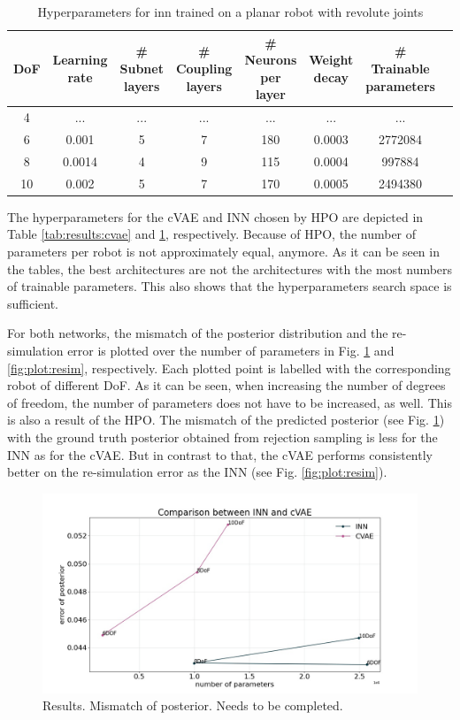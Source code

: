 \documentclass[conference]{IEEEtran}
\begin{document}
\begin{table}[h]
\caption{Hyperparameters for inn trained on a planar robot with revolute joints}
\label{tab:results:inn}
\centering
\begin{tabular}{|c|c|c|c|c|c|c|c|}
\hline
DoF & Learning rate & \# Subnet layers & \# Coupling layers & \# Neurons per layer & Weight decay & \# Trainable parameters \\
\hline
4  & ... & ...& ... & ... & ... & ... \\
6  & 0.001 & 5 & 7 & 180 & 0.0003 & 2772084 \\
8  & 0.0014 & 4 & 9 & 115 & 0.0004 & 997884 \\
10  & 0.002 & 5 & 7 & 170 & 0.0005 & 2494380 \\
\hline
\end{tabular}
\end{table}

The hyperparameters for the cVAE and INN chosen by HPO are depicted in Table \ref{tab:results:cvae} and \ref{tab:results:inn}, respectively. Because of HPO, the number of parameters per robot is not approximately equal, anymore. As it can be seen in the tables, the best architectures are not the architectures with the most numbers of trainable parameters. This also shows that the hyperparameters search space is sufficient. 

For both networks, the mismatch of the posterior distribution and the re-simulation error is plotted over the number of parameters in Fig. \ref{fig:plot:posterior} and \ref{fig:plot:resim}, respectively. Each plotted point is labelled with the corresponding robot of different DoF. As it can be seen, when increasing the number of degrees of freedom, the number of parameters does not have to be increased, as well. This is also a result of the HPO. 
The mismatch of the predicted posterior (see Fig. \ref{fig:plot:posterior}) with the ground truth posterior obtained from rejection sampling is less for the INN as for the cVAE. But in contrast to that, the cVAE performs consistently better on the re-simulation error as the INN (see Fig. \ref{fig:plot:resim}).

\begin{figure}[!ht]
\centering
	\includegraphics[width=\linewidth]{figures/comparison_e_posterior_alternative.jpg}
    \caption{\label{fig:plot:posterior} Results. Mismatch of posterior. Needs to be completed.}
\end{figure}
\end{document}
